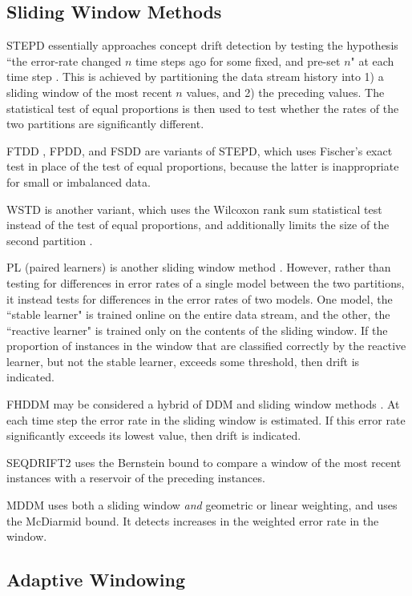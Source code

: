 \subsection{Sliding Window Methods}

STEPD essentially approaches concept drift detection by testing the hypothesis ``the error-rate changed $n$ time steps ago for some fixed, and pre-set $n$" at each time step \cite{STEPD}. This is achieved by partitioning the data stream history into 1) a sliding window of the most recent $n$ values, and 2) the preceding values. The statistical test of equal proportions is then used to test whether the rates of the two partitions are significantly different.

FTDD , FPDD, and FSDD \cite{FTDD} are variants of STEPD, which uses Fischer's exact test %
in place of the test of equal proportions, because the latter is inappropriate for small or imbalanced data. 

WSTD is another variant, which uses the Wilcoxon rank sum statistical test instead of the test of equal proportions, and additionally limits the size of the second partition \cite{WSTD}.

PL (paired learners) is another sliding window method \cite{PL}. However, rather than testing for differences in error rates of a single model between the two partitions, it instead tests for differences in the error rates of two models. One model, the ``stable learner" is trained online on the entire data stream, and the other, the ``reactive learner" is trained only on the contents of the sliding window. If the proportion of instances in the window that are classified correctly by the reactive learner, but not the stable learner, exceeds some threshold, then drift is indicated.

FHDDM may be considered a hybrid of DDM and sliding window methods \cite{FHDDM}. At each time step the error rate in the sliding window is estimated. If this error rate significantly exceeds its lowest value, then drift is indicated.

SEQDRIFT2 \cite{seq_drift} uses the Bernstein bound to compare a window of the most recent instances with a reservoir of the preceding instances.

MDDM \cite{MDDM} uses both a sliding window {\it and} geometric or linear weighting, and uses the McDiarmid bound. It detects increases in the weighted error rate in the window.

\subsection{Adaptive Windowing}


